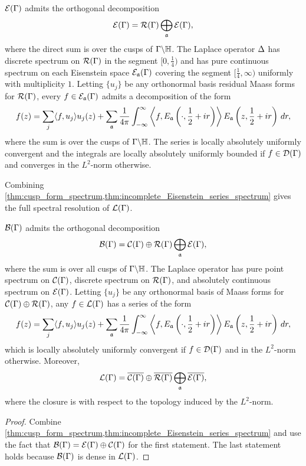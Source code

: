       \begin{theorem}\label{thm:incomplete_Eisenstein_series_spectrum}
        $\mathcal{E}(\Gamma)$ admits the orthogonal decomposition
        \[
          \mathcal{E}(\Gamma) = \mathcal{R}(\Gamma) \bigoplus_{\mathfrak{a}}\mathcal{E}(\Gamma),
        \]
        where the direct sum is over the cusps of $\Gamma\backslash\mathbb{H}$. The Laplace operator $\Delta$ has discrete spectrum on $\mathcal{R}(\Gamma)$ in the segment $[0,\frac{1}{4})$ and has pure continuous spectrum on each Eisenstein space $\mathcal{E}_{\mathfrak{a}}(\Gamma)$ covering the segment $\big[\frac{1}{4},\infty\big)$ uniformly with multiplicity $1$. Letting $\{u_{j}\}$ be any orthonormal basis residual Maass forms for $\mathcal{R}(\Gamma)$, every $f \in \mathcal{E}_{\mathfrak{a}}(\Gamma)$ admits a decomposition of the form
        \[
          f(z) = \sum_{j}\langle f,u_{j}\rangle u_{j}(z)+\sum_{\mathfrak{a}}\frac{1}{4\pi}\int_{-\infty}^{\infty}\left\langle f,E_{\mathfrak{a}}\left(\cdot,\frac{1}{2}+ir\right)\right\rangle E_{\mathfrak{a}}\left(z,\frac{1}{2}+ir\right)\,dr,
        \]
        where the sum is over the cusps of $\Gamma\backslash\mathbb{H}$. The series is locally absolutely uniformly convergent and the integrals are locally absolutely uniformly bounded if $f \in \mathcal{D}(\Gamma)$ and converges in the $L^{2}$-norm otherwise.
      \end{theorem}

      Combining \cref{thm:cusp_form_spectrum,thm:incomplete_Eisenstein_series_spectrum} gives the full spectral resolution of $\mathcal{L}(\Gamma)$.

      \begin{theorem}\label{thm:the_full_spectral_resolution}
        $\mathcal{B}(\Gamma)$ admits the orthogonal decomposition
        \[
          \mathcal{B}(\Gamma) = \mathcal{C}(\Gamma) \oplus \mathcal{R}(\Gamma) \bigoplus_{\mathfrak{a}}\mathcal{E}(\Gamma),
        \]
        where the sum is over all cusps of $\Gamma\backslash\mathbb{H}$. The Laplace operator has pure point spectrum on $\mathcal{C}(\Gamma)$, discrete spectrum on $\mathcal{R}(\Gamma)$, and absolutely continuous spectrum on $\mathcal{E}(\Gamma)$. Letting $\{u_{j}\}$ be any orthonormal basis of Maass forms for $\mathcal{C}(\Gamma) \oplus \mathcal{R}(\Gamma)$, any $f \in \mathcal{L}(\Gamma)$ has a series of the form
        \[
          f(z) = \sum_{j}\langle f,u_{j}\rangle u_{j}(z)+\sum_{\mathfrak{a}}\frac{1}{4\pi}\int_{-\infty}^{\infty}\left\langle f,E_{\mathfrak{a}}\left(\cdot,\frac{1}{2}+ir\right)\right\rangle E_{\mathfrak{a}}\left(z,\frac{1}{2}+ir\right)\,dr,
        \]
        which is locally absolutely uniformly convergent if $f \in \mathcal{D}(\Gamma)$ and in the $L^{2}$-norm otherwise. Moreover,
        \[
          \mathcal{L}(\Gamma) = \overline{\mathcal{C}(\Gamma)} \oplus  \overline{\mathcal{R}(\Gamma)} \bigoplus_{\mathfrak{a}}\overline{\mathcal{E}(\Gamma)},
        \]
        where the closure is with respect to the topology induced by the $L^{2}$-norm.
      \end{theorem}
      \begin{proof}
        Combine \cref{thm:cusp_form_spectrum,thm:incomplete_Eisenstein_series_spectrum} and use the fact that $\mathcal{B}(\Gamma) = \mathcal{E}(\Gamma) \oplus \mathcal{C}(\Gamma)$ for the first statement. The last statement holds because $\mathcal{B}(\Gamma)$ is dense in $\mathcal{L}(\Gamma)$.
      \end{proof}
